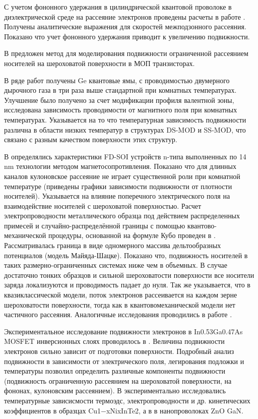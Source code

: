 С учетом фононного удержания в цилиндрической квантовой проволоке в диэлектрической среде на рассеяние электронов проведены расчеты в работе \cite{Vartanian2003}. Получены аналитические выражения для скоростей межподзонного рассеяния. Показано что учет фононного удержания приводит к увеличению подвижности.

В \cite{Lizzit2013} предложен метод для моделирования подвижности ограниченной рассеянием носителей на шероховатой поверхности в МОП транзисторах.

В ряде работ \cite{Myronov2008a,Myronov2008,Mironov2014,Myronov2015} получены Ge квантовые ямы, с проводимостью двумерного дырочного газа в три раза выше стандартной при комнатных температурах. Улучшение было получено за счет модификации профиля валентной зоны, исследована зависимость проводимости от магнитного поля при комнатных температурах. Указывается на то что температурная зависимость подвижности различна в области низких температур в структурах DS-MOD и SS-MOD, что связано с разным качеством поверхности этих структур.

В \cite{Shin2015} определялись характеристики FD-SOI устройств n-типа выполненных по 14 nm технологии методом магнетосопротивления. Показано что для длинных каналов кулоновское рассеяние не играет существенной роли при комнатной температуре (приведены графики зависимости подвижности от плотности носителей). Указывается на влияние поперечного электрического поля на взаимодействие носителей с шероховатой поверхностью. Расчет электропроводности металлического образца под действием распределенных примесей и случайно-распределённой границы с помощью квантово-механической процедуры, основанной на формуле Кубо проведен в \cite{Moraga2015}. Рассматривалась граница в виде одномерного массива дельтообразных потенциалов (модель Майяда-Шацке). Показано что, подвижность носителей в таких размерно-ограниченных системах ниже чем в объемных. В случае достаточно тонких образцов и сильной шероховатости поверхности все носители заряда локализуются и проводимость падает до нуля. Так же указывается, что в квазиклассической модели, поток электронов рассеивается на каждом зерне шероховатости поверхности, тогда как в квантовомеханической модели нет частичного рассеяния. Аналогичные исследования проводились в работе \cite{Arenas2015}.

Экспериментальное исследование подвижности электронов в In0.53Ga0.47As MOSFET инверсионных слоях проводилось в \cite{Sonnet2011}. Величина подвижности электронов сильно зависит от подготовки поверхности. Подробный анализ подвижности в зависимости от электрического поля, легирования подложки и температуры позволил определить различные компоненты подвижности (подвижность ограниченную рассеянием на шероховатой поверхности, на фононах, кулоновским рассеянием). В \cite{Kucek2015} экспериментально исследовались температурные зависисмости термоэдс, электропроводности и др. кинетических коэффициентов в образцах Cu1−xNixInTe2, а в \cite{Galagali2015} в нанопроволоках ZnO GaN.

